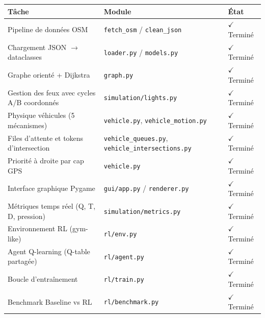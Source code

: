 \documentclass[a4paper,10pt]{article}
\begin{document}
\begin{tabular}{lll}
\toprule
\textbf{T\^{a}che} & \textbf{Module} & \textbf{\'{E}tat} \\
\midrule
Pipeline de donn\'{e}es OSM
  & \texttt{fetch\_osm} / \texttt{clean\_json}
  & $\checkmark$ Termin\'{e} \\
Chargement JSON $\to$ dataclasses
  & \texttt{loader.py} / \texttt{models.py}
  & $\checkmark$ Termin\'{e} \\
Graphe orient\'{e} + Dijkstra
  & \texttt{graph.py}
  & $\checkmark$ Termin\'{e} \\
Gestion des feux avec cycles A/B coordonn\'{e}s
  & \texttt{simulation/lights.py}
  & $\checkmark$ Termin\'{e} \\
Physique v\'{e}hicules (5 m\'{e}canismes)
  & \texttt{vehicle.py}, \texttt{vehicle\_motion.py}
  & $\checkmark$ Termin\'{e} \\
Files d'attente et tokens d'intersection
  & \texttt{vehicle\_queues.py}, \texttt{vehicle\_intersections.py}
  & $\checkmark$ Termin\'{e} \\
Priorit\'{e} \`{a} droite par cap GPS
  & \texttt{vehicle.py}
  & $\checkmark$ Termin\'{e} \\
Interface graphique Pygame
  & \texttt{gui/app.py} / \texttt{renderer.py}
  & $\checkmark$ Termin\'{e} \\
M\'{e}triques temps r\'{e}el (Q, T, D, pression)
  & \texttt{simulation/metrics.py}
  & $\checkmark$ Termin\'{e} \\
Environnement RL (gym-like)
  & \texttt{rl/env.py}
  & $\checkmark$ Termin\'{e} \\
Agent Q-learning (Q-table partag\'{e}e)
  & \texttt{rl/agent.py}
  & $\checkmark$ Termin\'{e} \\
Boucle d'entra\^{i}nement
  & \texttt{rl/train.py}
  & $\checkmark$ Termin\'{e} \\
Benchmark Baseline vs RL
  & \texttt{rl/benchmark.py}
  & $\checkmark$ Termin\'{e} \\
\bottomrule
\end{tabular}
\end{document}
